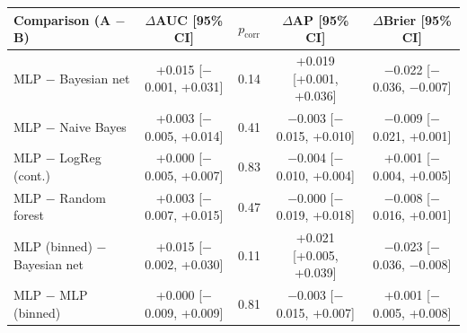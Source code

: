 \begin{tabular}{lcccc}
\toprule
Comparison (A $-$ B) & $\Delta$AUC [95\% CI] & $p_{\mathrm{corr}}$ & $\Delta$AP [95\% CI] & $\Delta$Brier [95\% CI] \\
\midrule
MLP $-$ Bayesian net & +0.015 [$-$0.001, +0.031] & 0.14 & +0.019 [+0.001, +0.036] & $-$0.022 [$-$0.036, $-$0.007] \\
MLP $-$ Naive Bayes & +0.003 [$-$0.005, +0.014] & 0.41 & $-$0.003 [$-$0.015, +0.010] & $-$0.009 [$-$0.021, +0.001] \\
MLP $-$ LogReg (cont.) & +0.000 [$-$0.005, +0.007] & 0.83 & $-$0.004 [$-$0.010, +0.004] & +0.001 [$-$0.004, +0.005] \\
MLP $-$ Random forest & +0.003 [$-$0.007, +0.015] & 0.47 & $-$0.000 [$-$0.019, +0.018] & $-$0.008 [$-$0.016, +0.001] \\
MLP (binned) $-$ Bayesian net & +0.015 [$-$0.002, +0.030] & 0.11 & +0.021 [+0.005, +0.039] & $-$0.023 [$-$0.036, $-$0.008] \\
MLP $-$ MLP (binned) & +0.000 [$-$0.009, +0.009] & 0.81 & $-$0.003 [$-$0.015, +0.007] & +0.001 [$-$0.005, +0.008] \\
\bottomrule
\end{tabular}
